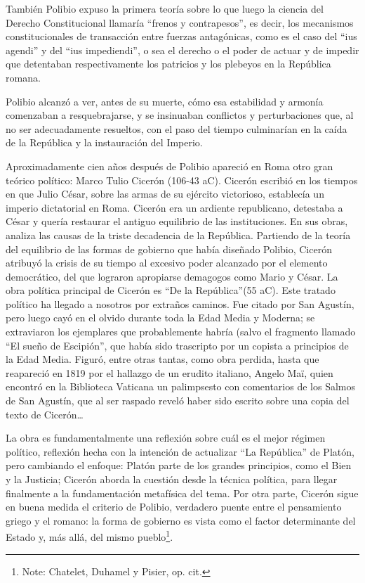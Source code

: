 \documentclass[
]{book}
\begin{document}
También Polibio expuso la primera teoría sobre lo que luego la ciencia del Derecho Constitucional llamaría ``frenos y contrapesos'', es decir, los mecanismos constitucionales de transacción entre fuerzas antagónicas, como es el caso del ``ius agendi'' y del ``ius impediendi'', o sea el derecho o el poder de actuar y de impedir que detentaban respectivamente los patricios y los plebeyos en la República romana.

Polibio alcanzó a ver, antes de su muerte, cómo esa estabilidad y armonía comenzaban a resquebrajarse, y se insinuaban conflictos y perturbaciones que, al no ser adecuadamente resueltos, con el paso del tiempo culminarían en la caída de la República y la instauración del Imperio.

Aproximadamente cien años después de Polibio apareció en Roma otro gran teórico político: Marco Tulio Cicerón (106-43 aC). Cicerón escribió en los tiempos en que Julio César, sobre las armas de su ejército victorioso, establecía un imperio dictatorial en Roma. Cicerón era un ardiente republicano, detestaba a César y quería restaurar el antiguo equilibrio de las instituciones. En sus obras, analiza las causas de la triste decadencia de la República. Partiendo de la teoría del equilibrio de las formas de gobierno que había diseñado Polibio, Cicerón atribuyó la crisis de su tiempo al excesivo poder alcanzado por el elemento democrático, del que lograron apropiarse demagogos como Mario y César. La obra política principal de Cicerón es ``De la República''(55 aC). Este tratado político ha llegado a nosotros por extraños caminos. Fue citado por San Agustín, pero luego cayó en el olvido durante toda la Edad Media y Moderna; se extraviaron los ejemplares que probablemente habría (salvo el fragmento llamado ``El sueño de Escipión'', que había sido trascripto por un copista a principios de la Edad Media. Figuró, entre otras tantas, como obra perdida, hasta que reapareció en 1819 por el hallazgo de un erudito italiano, Angelo Maï, quien encontró en la Biblioteca Vaticana un palimpsesto con comentarios de los Salmos de San Agustín, que al ser raspado reveló haber sido escrito sobre una copia del texto de Cicerón\ldots{}

La obra es fundamentalmente una reflexión sobre cuál es el mejor régimen político, reflexión hecha con la intención de actualizar ``La República'' de Platón, pero cambiando el enfoque: Platón parte de los grandes principios, como el Bien y la Justicia; Cicerón aborda la cuestión desde la técnica política, para llegar finalmente a la fundamentación metafísica del tema. Por otra parte, Cicerón sigue en buena medida el criterio de Polibio, verdadero puente entre el pensamiento griego y el romano: la forma de gobierno es vista como el factor determinante del Estado y, más allá, del mismo pueblo\footnote{Note: Chatelet, Duhamel y Pisier, op. cit.}.
\end{document}
